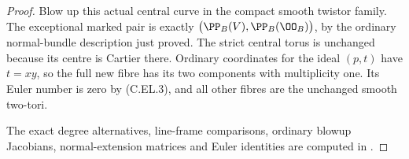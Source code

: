 \begin{proof}
Blow up this actual central curve in the compact smooth
twistor family. The exceptional marked pair is exactly
$\bigl(\PP_B(V),\PP_B(\OO_B)\bigr)$, by the ordinary
normal-bundle description just proved. The strict central
torus is unchanged because its centre is Cartier there.
Ordinary coordinates for the ideal $(p,t)$ have $t=xy$,
so the full new fibre has its two components with
multiplicity one. Its Euler number is zero by (C.EL.3),
and all other fibres are the unchanged smooth two-tori.

The exact degree alternatives, line-frame comparisons,
ordinary blowup Jacobians, normal-extension matrices and
Euler identities are computed in
.
\end{proof}
